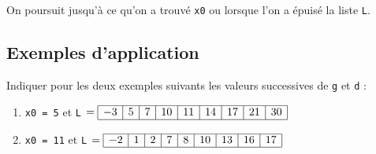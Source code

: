 On poursuit jusqu'à ce qu'on a trouvé \lstinline{x0} ou lorsque l'on a épuisé la liste \lstinline{L}.





\subsection{Exemples d'application}


Indiquer pour les deux exemples suivants les valeurs successives de \lstinline{g} et \lstinline{d} :
\begin{enumerate}
\item \lstinline{x0 = 5} et \lstinline{L} $= \begin{array}{|c|c|c|c|c|c|c|c|c|} 
\hline -3 & 5 & 7 & 10 & 11 & 14 & 17 & 21 & 30 \\ \hline
\end{array}$




\item \lstinline{x0 = 11} et \lstinline{L} $= \begin{array}{|c|c|c|c|c|c|c|c|c|} 
\hline -2 & 1 & 2 & 7 & 8 & 10 & 13 & 16 & 17  \\ \hline
\end{array}$

\end{enumerate}


